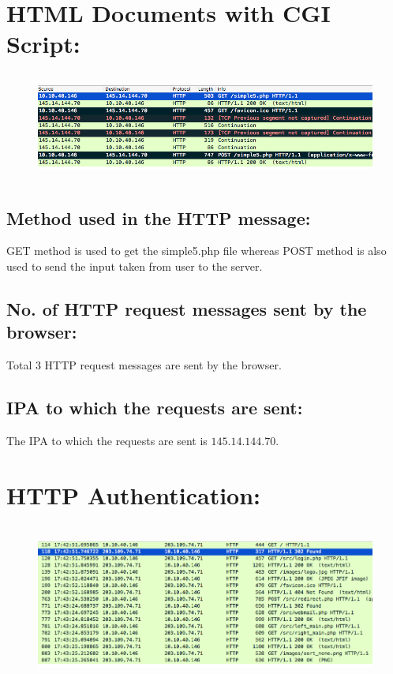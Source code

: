 \documentclass[]{report}
\begin{document}
\section{HTML Documents with CGI Script:}
\begin{figure}[H]
	\vspace{0pt}
	\includegraphics[height = 100pt, keepaspectratio]{Snapshots/q4/4.png}
\end{figure}
\subsection{Method used in the HTTP message:}
GET method is used to get the simple5.php file whereas POST method is also used to send the input taken from user to the server.
\subsection{No. of HTTP request messages sent by the browser:}
Total 3 HTTP request messages are sent by the browser.
\subsection{IPA to which the requests are sent:}
The IPA to which the requests are sent is $145.14.144.70$.


\section{HTTP Authentication:}
\begin{figure}[H]
	\vspace{0pt}
	\includegraphics[height = 150pt, keepaspectratio]{Snapshots/q5/5_1.png}
\end{figure}
\end{document}
